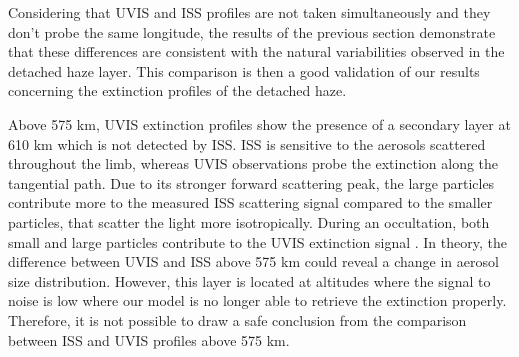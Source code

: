 Considering that UVIS and ISS profiles are not taken simultaneously and
they don't probe the same longitude, the results of the previous section demonstrate that these differences are
consistent with the natural variabilities observed in the detached haze layer.
This comparison is then a good validation of our results concerning the extinction profiles of the detached haze.

Above 575 km, UVIS extinction profiles show the presence of a secondary layer at 610 km which is not detected by ISS.
ISS is sensitive to the aerosols scattered throughout the limb, whereas UVIS observations probe the extinction along the tangential path.
Due to its stronger forward scattering peak, the large particles contribute more to the measured ISS scattering signal compared to the smaller particles, that scatter the light more isotropically. During an occultation, both small and large particles contribute to the UVIS extinction signal \citep{Cours2011}.
In theory, the difference between UVIS and ISS above 575 km could reveal a change in aerosol size distribution.
However, this layer is located at altitudes where the signal to noise is low where our model is no longer able to retrieve the extinction properly.
Therefore, it is not possible to draw a safe conclusion from the comparison between ISS and UVIS profiles above 575 km.
